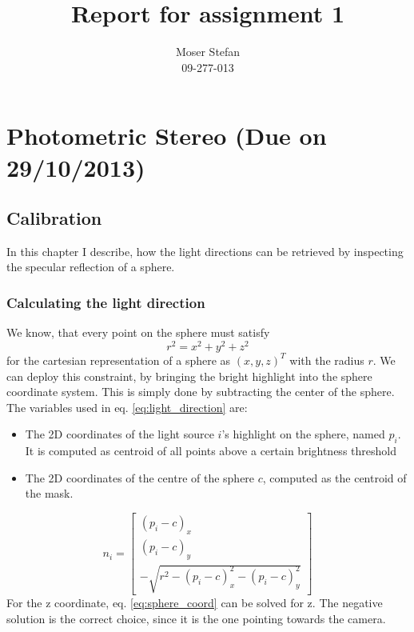 \documentclass{paper}
\title{Report for assignment 1}
\author{Moser Stefan\\09-277-013}
\begin{document}
\maketitle


%

\section{Photometric Stereo (Due on 29/10/2013)}

\subsection{Calibration}
In this chapter I describe, how the light directions can be retrieved by 
inspecting the specular reflection of a sphere.

\subsubsection{Calculating the light direction} 
We know, that every point on the sphere must satisfy
\begin{equation}
	r^2 = x^2 + y^2 + z^2
\label{eq:sphere_coord}
\end{equation}
for the cartesian representation of a sphere as $(x,y,z)^T$ with the radius $r$. We can deploy this constraint, by bringing the bright
 highlight into the sphere coordinate system. This is simply done 
 by subtracting the center of the sphere. The variables used in eq. \ref{eq:light_direction} are:
\begin{itemize}
\item The 2D coordinates of the light source $i$'s highlight on the sphere, named $p_i$. It is computed as centroid of all points above a certain brightness threshold
\item The 2D coordinates of the centre of the sphere $c$, computed as the centroid of the mask.
\end{itemize}
\begin{equation}
	n_i = 
	\left[ 
	\begin{array}{c}
	(p_i - c)_x \\
	(p_i - c)_y \\
	-\sqrt{r^2 - (p_i - c)_x^2 - (p_i - c)_y^2}
\end{array} 
\right] 
\label{eq:light_direction}
\end{equation}
For the z coordinate, eq. \ref{eq:sphere_coord} can be solved for z. The negative solution is the correct choice, since it is the one pointing towards the camera.
\end{document}
